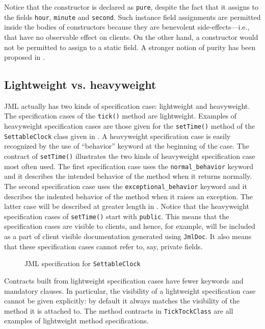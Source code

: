 \documentclass{llncs}
\begin{document}
Notice that the constructor is declared as \texttt{pure}, despite the fact 
that it assigns to the fields \texttt{hour}, \texttt{minute} and \texttt{second}.
Such instance field assignments are permitted inside the bodies of constructors
because they are benevolent side-effects---i.e., that have no observable effect
on clients.
%
On the other hand, a constructor would not be permitted to assign to a static
field.
%
A stronger notion of purity has been proposed in \cite{DarvasMuller05}.

\subsection{Lightweight vs. heavyweight}

JML actually has two kinds of specification case: lightweight and heavyweight.
%
The specification cases of the \texttt{tick()} method are lightweight.
%
%
Examples of heavyweight specification cases are those given for the
\texttt{setTime()} method of the \texttt{SettableClock} class given in
.
%
A heavyweight specification case is easily recognized by the use of
``behavior'' keyword at the beginning of the case.
%
The contract of \texttt{setTime()} illustrates the two kinds of heavyweight
specification case most often used.
%
The first specification case uses the \texttt{normal\_behavior} keyword and it
describes the intended behavior of the method when it returns normally.
%
%
The second specification case uses the \texttt{exceptional\_behavior} keyword and it
describes the indented behavior of the method when it raises an exception.
%
The latter case will be described at greater length in .
Notice that the heavyweight specification cases of \texttt{setTime()} start
with \texttt{public}.
%
%
This means that the specification cases are visible to clients, and hence, for
example, will be included as a part of client visible documentation generated
using \texttt{JmlDoc}. It also means that these specification cases cannot
refer to, say, private fields.

\begin{figure}[tbp]
%

%
\vspace*{-2ex} %
\caption{JML specification for \texttt{SettableClock}}
\label{Example:SettableClock}
\end{figure}
%
Contracts built from lightweight specification cases have fewer keywords and
mandatory clauses.  In particular, the visibility of a lightweight
specification case cannot be given explicitly: by default it always matches
the visibility of the method it is attached to.
%
The method  contracts in \texttt{TickTockClass} are all examples of 
lightweight method specifications.
\end{document}
